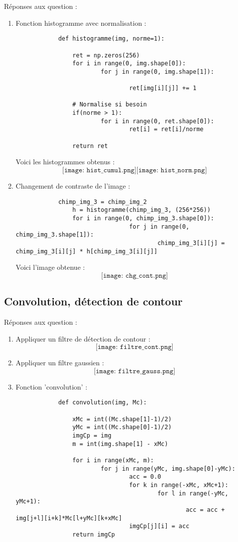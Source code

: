 \documentclass[12pt]{article}
\begin{document}
Réponses aux question :
\begin{enumerate}

	\item 
		Fonction histogramme avec normalisation :
		\begin{verbatim}
			def histogramme(img, norme=1):
    
				ret = np.zeros(256)
				for i in range(0, img.shape[0]):
						for j in range(0, img.shape[1]):
								
								ret[img[i][j]] += 1
								
				# Normalise si besoin
				if(norme > 1):
						for i in range(0, ret.shape[0]):
								ret[i] = ret[i]/norme
								
				return ret
		\end{verbatim}
		
		Voici les histogrammes obtenus :
		$$
			\texttt{[image: hist\_cumul.png]}
			\texttt{[image: hist\_norm.png]}
		$$
	
	\item
		Changement de contraste de l'image : 
		\begin{verbatim}
			chimp_img_3 = chimp_img_2
				h = histogramme(chimp_img_3, (256*256))
				for i in range(0, chimp_img_3.shape[0]):
								for j in range(0, chimp_img_3.shape[1]):
										chimp_img_3[i][j] = chimp_img_3[i][j] * h[chimp_img_3[i][j]]

		\end{verbatim}
		Voici l'image obtenue : 
		$$
			\texttt{[image: chg\_cont.png]}
		$$
\end{enumerate}

\subsection{Convolution, détection de contour}
	
Réponses aux question :
\begin{enumerate}

	\item 
		Appliquer un filtre de détection de contour : 
		$$
			\texttt{[image: filtre\_cont.png]}
		$$
		
	\item
		Appliquer un filtre gaussien : 
		$$
			\texttt{[image: filtre\_gauss.png]}
		$$
		
	\item
		Fonction 'convolution' : 
		\begin{verbatim}
			def convolution(img, Mc):
    
				xMc = int((Mc.shape[1]-1)/2)
				yMc = int((Mc.shape[0]-1)/2)
				imgCp = img
				m = int(img.shape[1] - xMc)
				
				for i in range(xMc, m):
						for j in range(yMc, img.shape[0]-yMc):
								acc = 0.0
								for k in range(-xMc, xMc+1):
										for l in range(-yMc, yMc+1):
												acc = acc + img[j+l][i+k]*Mc[l+yMc][k+xMc]
								imgCp[j][i] = acc
				return imgCp
		\end{verbatim}
		
\end{enumerate}
\end{document}
